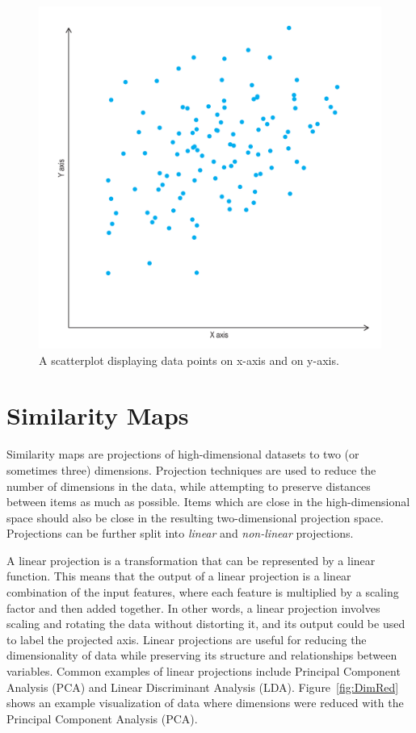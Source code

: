 \begin{figure}[tp]
\centering
\includegraphics[frame,keepaspectratio,width=\linewidth,height=\halfh]
{diagrams/scatterplot.pdf}

\caption[Scatterplot]
{
A scatterplot displaying data points on x-axis and on y-axis.
}
\label{fig:ScatterplotDiagram}
\end{figure}





\section{Similarity Maps}

Similarity maps are projections of high-dimensional datasets to two (or
sometimes three) dimensions. Projection techniques are used to reduce the
number of dimensions in the data, while attempting to preserve distances
between items as much as possible. Items which are close in the
high-dimensional space should also be close in the resulting
two-dimensional projection space. Projections can be further split into
\emph{linear} and \emph{non-linear} projections. 

A linear projection is a transformation that can be represented by a
linear function. This means that the output of a linear projection is a
linear combination of the input features, where each feature is multiplied
by a scaling factor and then added together. In other words, a linear
projection involves scaling and rotating the data without distorting it,
and its output could be used to label the projected axis. Linear
projections are useful for reducing the dimensionality of data while
preserving its structure and relationships between variables. Common
examples of linear projections include Principal Component Analysis (PCA)
and Linear Discriminant Analysis (LDA). Figure~\ref{fig:DimRed} shows an
example visualization of data where dimensions were reduced with the
Principal Component Analysis (PCA). 

